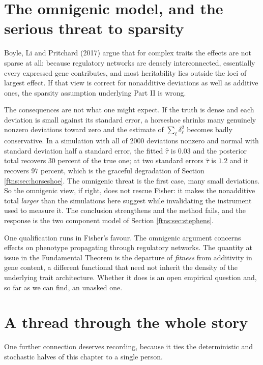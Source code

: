 \section{The omnigenic model, and the serious threat to sparsity}
\label{ftns:sec:omnigenic}

Boyle, Li and Pritchard (2017) argue that for complex traits the effects are not sparse at all:
because regulatory networks are densely interconnected, essentially every expressed gene
contributes, and most heritability lies outside the loci of largest effect. If that view is correct
for nonadditive deviations as well as additive ones, the sparsity assumption underlying Part II is
wrong.

The consequences are not what one might expect. If the truth is dense and each deviation is small against its standard error, a horseshoe shrinks many genuinely nonzero deviations toward zero and the estimate of $\sum_\ell\delta_\ell^2$ becomes badly conservative. In a simulation with all of $2000$ deviations nonzero and normal with standard deviation half a standard error, the fitted $\hat\tau$ is $0.03$ and the posterior total recovers $30$ percent of the true one; at two standard errors $\hat\tau$ is $1.2$ and it recovers $97$ percent, which is the graceful degradation of Section \ref{ftns:sec:horseshoe}. The omnigenic threat is the first case, many small deviations. So the omnigenic view, if right, does not rescue Fisher: it makes the nonadditive
total \emph{larger} than the simulations here suggest while invalidating the instrument used to
measure it. The conclusion strengthens and the method fails, and the response is the two component
model of Section \ref{ftns:sec:stephens}.

One qualification runs in Fisher's favour. The omnigenic argument concerns effects on phenotype
propagating through regulatory networks. The quantity at issue in the Fundamental Theorem is the
departure of \emph{fitness} from additivity in gene content, a different functional that need not
inherit the density of the underlying trait architecture. Whether it does is an open empirical
question and, so far as we can find, an unasked one.

\section{A thread through the whole story}
\label{ftns:sec:cedric}

One further connection deserves recording, because it ties the deterministic and stochastic halves
of this chapter to a single person.

